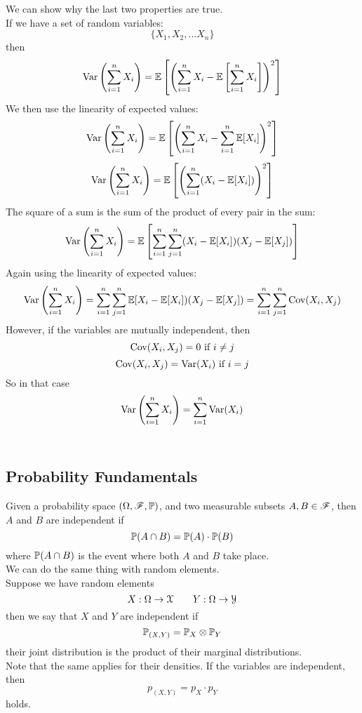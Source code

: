\documentclass[12pt]{article}
\begin{document}
    We can show why the last two
    properties are true. \\
    If we have a set of random 
    variables:
    \[ \{ X_1, X_2, \dots X_n \} \]
    then
    \[ \text{Var}\left( \sum_{i=1}^{n}X_i \right)
        = \mathbb{E}\left[ \left( \sum_{i=1}^{n}X_i 
    - \mathbb{E}\left[ \sum_{i=1}^{n}X_i \right] \right)^2 \right]\]
    We then use the linearity of expected values:
    \[ \text{Var}\left( \sum_{i=1}^{n}X_i \right)
    = \mathbb{E}\left[ \left( \sum_{i=1}^{n}X_i 
    - \sum_{i=1}^{n}\mathbb{E}[X_i] \right)^2 \right]\]
    \[ \text{Var}\left( \sum_{i=1}^{n}X_i \right)
    = \mathbb{E}\left[ \left( \sum_{i=1}^{n} (X_i 
    - \mathbb{E}[X_i]) \right)^2 \right]\]
    The square of a sum
    is the sum of the product 
    of every pair in the sum:
    \[ \text{Var}\left( \sum_{i=1}^{n}X_i \right)
    = \mathbb{E}\left[ \sum_{i=1}^{n}\sum_{j=1}^{n}
    (X_i - \mathbb{E}[X_i])(X_j - \mathbb{E}[X_j]) \right]\]
    Again using the linearity of expected values:
    \[ \text{Var}\left( \sum_{i=1}^{n}X_i \right)
    = \sum_{i=1}^{n}\sum_{j=1}^{n}
    \mathbb{E}[X_i - \mathbb{E}[X_i])(X_j - \mathbb{E}[X_j])
    = \sum_{i=1}^{n}\sum_{j=1}^{n}\text{Cov}(X_i, X_j) \]
    However, if the variables are mutually
    independent, then
    \[ \text{Cov}(X_i, X_j) = 0 \text{ if } i \neq j\]
    \[ \text{Cov}(X_i, X_j) = \text{Var}(X_i) 
    \text{ if } i = j\]
    So in that case
    \[ \text{Var}\left( \sum_{i=1}^{n}X_i \right) = 
    \sum_{i=1}^{n} \text{Var}(X_i) \] \\

    \newpage

    \subsection*{Probability Fundamentals}

    Given a probability space
    $(\Omega, \mathscr{F}, \mathbb{P})$,
    and two measurable subsets
    $A, B \in \mathscr{F}$,
    then $A$ and $B$
    are independent if
    \[ \mathbb{P}(A \cap B) 
    = \mathbb{P}(A) \cdot \mathbb{P}(B) \]
    where $ \mathbb{P}(A \cap B)$
    is the event where both $A$
    and $B$ take place. \\

    We can do the same thing
    with random elements. \\
    Suppose we have random elements
    \[ X: \Omega \to \mathcal{X} \qquad
    Y: \Omega \to \mathcal{Y} \]
    then we say that $X$ and $Y$
    are independent if
    \[ \mathbb{P}_{(X, Y)}
    = \mathbb{P}_X \otimes \mathbb{P}_Y \]
    their joint distribution is the
    product of their marginal distributions. \\
    Note that the same applies
    for their densities.
    If the variables are independent,
    then 
    \[ p_{(X, Y)} = p_X \cdot p_Y \]
    holds. \\
\end{document}
